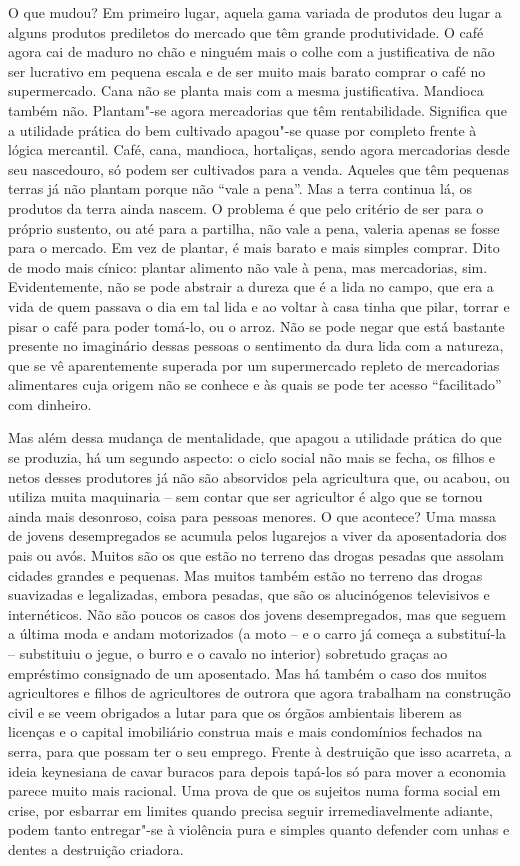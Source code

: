 O que mudou? Em primeiro lugar, aquela gama variada de produtos deu
lugar a alguns produtos prediletos do mercado que têm grande
produtividade. O café agora cai de maduro no chão e ninguém mais o colhe
com a justificativa de não ser lucrativo em pequena escala e de ser
muito mais barato comprar o café no supermercado. Cana não se planta
mais com a mesma justificativa. Mandioca também não. Plantam"-se agora
mercadorias que têm rentabilidade. Significa que a utilidade prática do
bem cultivado apagou"-se quase por completo frente à lógica mercantil.
Café, cana, mandioca, hortaliças, sendo agora mercadorias desde seu
nascedouro, só podem ser cultivados para a venda. Aqueles que têm
pequenas terras já não plantam porque não ``vale a pena''. Mas a terra
continua lá, os produtos da terra ainda nascem. O problema é que pelo
critério de ser para o próprio sustento, ou até para a partilha, não
vale a pena, valeria apenas se fosse para o mercado. Em vez de plantar,
é mais barato e mais simples comprar. Dito de modo mais cínico: plantar
alimento não vale à pena, mas mercadorias, sim. Evidentemente, não se
pode abstrair a dureza que é a lida no campo, que era a vida de quem
passava o dia em tal lida e ao voltar à casa tinha que pilar, torrar e
pisar o café para poder tomá-lo, ou o arroz. Não se pode negar que está
bastante presente no imaginário dessas pessoas o sentimento da dura lida
com a natureza, que se vê aparentemente superada por um supermercado
repleto de mercadorias alimentares cuja origem não se conhece e às quais
se pode ter acesso ``facilitado'' com dinheiro.

Mas além dessa mudança de mentalidade, que apagou a utilidade prática do
que se produzia, há um segundo aspecto: o ciclo social não mais se
fecha, os filhos e netos desses produtores já não são absorvidos pela
agricultura que, ou acabou, ou utiliza muita maquinaria -- sem contar
que ser agricultor é algo que se tornou ainda mais desonroso, coisa para
pessoas menores. O que acontece? Uma massa de jovens desempregados se
acumula pelos lugarejos a viver da aposentadoria dos pais ou avós.
Muitos são os que estão no terreno das drogas pesadas que assolam
cidades grandes e pequenas. Mas muitos também estão no terreno das
drogas suavizadas e legalizadas, embora pesadas, que são os alucinógenos
televisivos e internéticos. Não são poucos os casos dos jovens
desempregados, mas que seguem a última moda e andam motorizados (a moto
-- e o carro já começa a substituí-la -- substituiu o jegue, o burro e o
cavalo no interior) sobretudo graças ao empréstimo consignado de um
aposentado. Mas há também o caso dos muitos agricultores e filhos de
agricultores de outrora que agora trabalham na construção civil e se
veem obrigados a lutar para que os órgãos ambientais liberem as licenças
e o capital imobiliário construa mais e mais condomínios fechados na
serra, para que possam ter o seu emprego. Frente à destruição que isso
acarreta, a ideia keynesiana de cavar buracos para depois tapá-los só
para mover a economia parece muito mais racional. Uma prova de que os
sujeitos numa forma social em crise, por esbarrar em limites quando precisa seguir
irremediavelmente adiante, podem tanto entregar"-se à violência pura e
simples quanto defender com unhas e dentes a destruição criadora.

